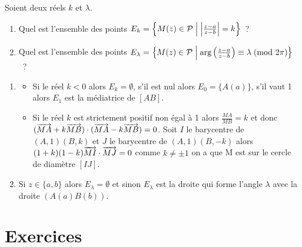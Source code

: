                                 Soient deux réels \(k\) et \(\lambda\).
                                \begin{enumerate}
                                  \item Quel est l'ensemble des points \(E_k = \left\{M(z) \in 
                                    \mathcal{P}\mathrel{}\middle|\mathrel{}\left\lvert\frac{z-a}{z-b}\right\rvert = k\right\}\)~?
                                  \item Quel est l'ensemble des points \(E_\lambda = \left\{M(z) \in 
                                    \mathcal{P}\mathrel{}\middle|\mathrel{}\arg \left(\frac{z-a}{z-b} \right) \equiv \lambda\!\pmod {2\pi}\right\}\)~?
                                \end{enumerate}
                                \begin{enumerate}
                                  \item 
                                    \begin{itemize}
                                      \item Si le réel \(k<0\) alors \(E_k = \emptyset\), s'il est nul 
                                        alors \(E_0 = \{A(a)\}\), s'il vaut 1 alors \(E_1\) est la 
                                        médiatrice de \([AB]\).
                                      \item Si le réel \(k\) est strictement positif non égal à 1 alors 
                                        \(\frac{MA}{MB} = k\) et donc \((\overrightarrow{MA} + k\overrightarrow{MB}) \cdot 
                                        (\overrightarrow{MA}-k\overrightarrow{MB}) = 0\). Soit \(I\) le barycentre de 
                                        \((A,1)(B,k)\) et \(J\) le barycentre de \((A,1)(B,-k)\) alors 
                                        \((1 + k)(1-k) \overrightarrow{MI} \cdot \overrightarrow{MJ}  = 0\) comme \(k \neq 
                                        \pm 1\) on a que M est sur le cercle de diamètre \([IJ]\).
                                    \end{itemize}
                                  \item Si \(z \in \{a,b\}\) alors \(E_\lambda = \emptyset\) et sinon 
                                    \(E_\lambda\) est la droite qui forme l'angle \(\lambda\) avec la droite 
                                    \((A(a)B(b))\).
                                \end{enumerate}

                                \section{Exercices}

